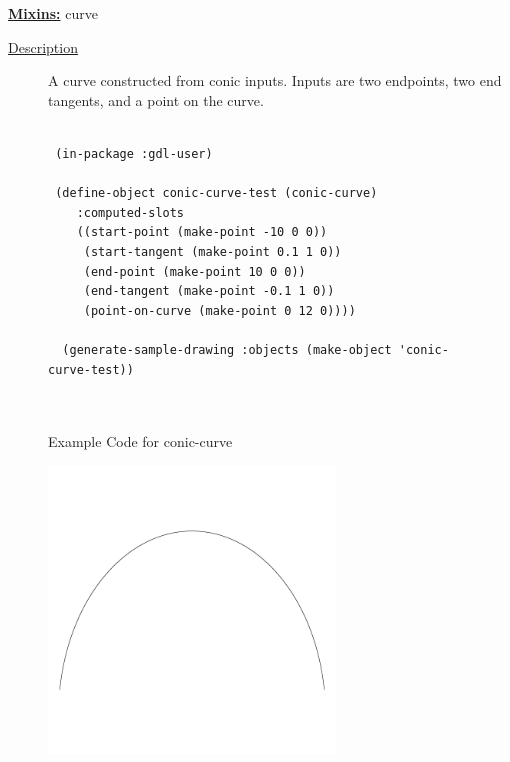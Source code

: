 \documentclass [11pt]{book}
\begin{document}
\begin{itemize}
\textbf{
\underline{Mixins:}} curve





\begin{description}

\item [
\underline{Description}]


A curve constructed from conic inputs. Inputs are two endpoints, two end tangents,
and a point on the curve.



\end{description}




\begin{figure}
\begin{lrbox}{\boxedverb}
\begin{minipage}{\linewidth}
{\small

\begin{verbatim}

 (in-package :gdl-user)

 (define-object conic-curve-test (conic-curve)
    :computed-slots
    ((start-point (make-point -10 0 0))
     (start-tangent (make-point 0.1 1 0))
     (end-point (make-point 10 0 0))
     (end-tangent (make-point -0.1 1 0))
     (point-on-curve (make-point 0 12 0))))
     
  (generate-sample-drawing :objects (make-object 'conic-curve-test))



\end{verbatim}}
\end{minipage}
\end{lrbox}
\fbox{\usebox{\boxedverb}}

\caption{Example Code for conic-curve}

\label{fig:example-code-conic-curve}

\end{figure}

\begin{figure}
\begin{center}
\includegraphics[width=3in,height=3in]{../images/example-conic-curve.pdf}
\end{center}


\end{figure}
\end{itemize}
\end{document}
